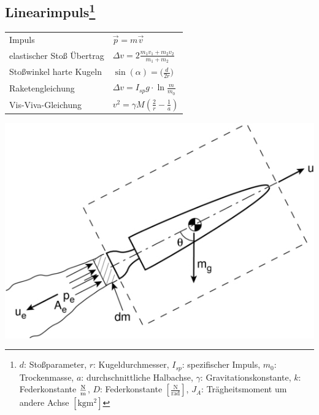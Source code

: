 \documentclass[12pt,a4paper]{article}
\renewcommand{\=}[1]{\stackrel{#1}{=}}
\newcommand{\units}[2]{\frac{\text #1}{\text #2}}
\theoremstyle{definition}
\theoremstyle{remark}
\begin{document}
\subsection[Linearimpuls]{Linearimpuls\let\thefootnote\relax\footnote{$d$: Stoßparameter, $r$: Kugeldurchmesser, $I_{sp}$: spezifischer Impuls, $m_0$: Trockenmasse, $a$: durchschnittliche Halbachse, $\gamma$: Gravitationskonstante, $k$: Federkonstante $\units{N}{m}$, $D$: Federkonstante $[\frac{\text{N}}{\text{rad}}]$, $J_A$: Trägheitsmoment um andere Achse $[\text{kg} \text{m}^2]$}}
\begin{center}
\begin{minipage}[t]{.6\linewidth}
\vspace{0pt}
\begin{tabular}{ll}
Impuls & $\vec{p} = m \vec{v}$\\
elastischer Stoß Übertrag & $\Delta v = 2 \frac{m_1 v_1 + m_2 v_2}{m_1 + m_2}$\\
Stoßwinkel harte Kugeln & $\sin(\alpha) = \big(\frac{d}{2r}\big)$\\
Raketengleichung & $\Delta v = I_{sp} g \cdot \ln \frac{m}{m_0}$\\
Vis-Viva-Gleichung & $v^2 = \gamma M (\frac{2}{r} - \frac{1}{a})$\\
\end{tabular}
\end{minipage}%
\begin{minipage}[t]{.4\linewidth}
\vspace{0pt}
\centering
\includegraphics[width=\linewidth]{pic/rocket.jpg}
\end{minipage}
\end{center}
\end{document}
